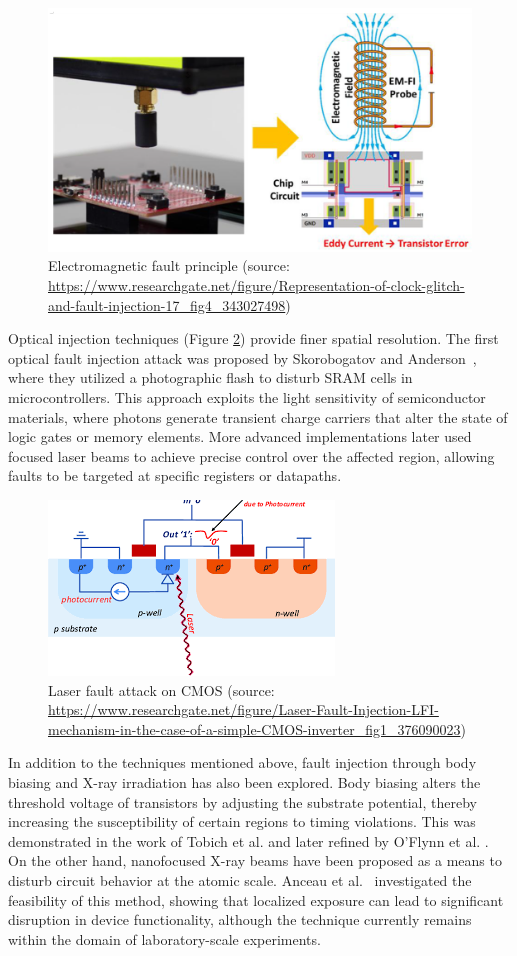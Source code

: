 \begin{figure}[t!]
  \centering
  \includegraphics[width=0.5\linewidth]{Chapitre1/figures/em.png}
  \caption{Electromagnetic fault principle (source: \url{https://www.researchgate.net/figure/Representation-of-clock-glitch-and-fault-injection-17_fig4_343027498})}
  \label{electromagnetic fault}
\end{figure}

Optical injection techniques (Figure \ref{optical fault}) provide finer spatial resolution. The first optical fault injection attack was proposed by Skorobogatov and Anderson~\cite{skorobogatov2003optical}, where they utilized a photographic flash to disturb SRAM cells in microcontrollers. This approach exploits the light sensitivity of semiconductor materials, where photons generate transient charge carriers that alter the state of logic gates or memory elements. More advanced implementations later used focused laser beams to achieve precise control over the affected region, allowing faults to be targeted at specific registers or datapaths.

\begin{figure}[t!]
  \centering
  \includegraphics[width=0.5\linewidth]{Chapitre1/figures/laser.png}
  \caption{Laser fault attack on CMOS (source: \url{https://www.researchgate.net/figure/Laser-Fault-Injection-LFI-mechanism-in-the-case-of-a-simple-CMOS-inverter_fig1_376090023})}
  \label{optical fault}
\end{figure}

In addition to the techniques mentioned above, fault injection through body biasing and X-ray irradiation has also been explored. Body biasing alters the threshold voltage of transistors by adjusting the substrate potential, thereby increasing the susceptibility of certain regions to timing violations. This was demonstrated in the work of Tobich et al. \cite{tobich2012yet} and later refined by O'Flynn et al. \cite{o2021low}. On the other hand, nanofocused X-ray beams have been proposed as a means to disturb circuit behavior at the atomic scale. Anceau et al.~\cite{anceau2017nanofocused} investigated the feasibility of this method, showing that localized exposure can lead to significant disruption in device functionality, although the technique currently remains within the domain of laboratory-scale experiments.

